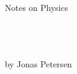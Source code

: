\begin{titlepage}
\begin{center}







~\\~\\~\\~\\~\\~\\~\\~\\~\\~\\~\\~\\~\\~\\
\LARGE
Notes on Physics
\normalsize

~\\~\\~\\
\large
by Jonas Petersen\\~\\

\end{center}
\end{titlepage}